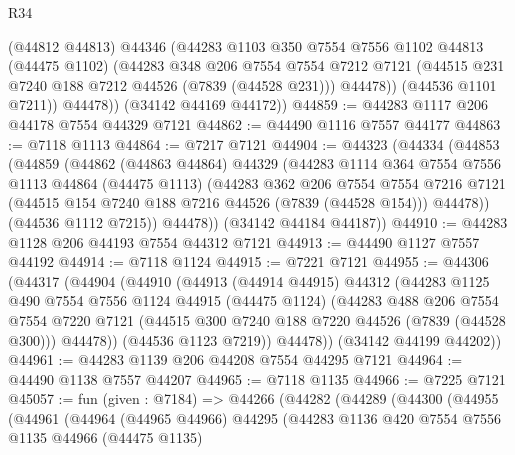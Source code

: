 \begin{lexlean}{R34}
\begin{coremodule}
            (@44812 @44813)
            @44346
            (@44283
              @1103
              @350
              @7554
              @7556
              @1102
              @44813
              (@44475 @1102)
              (@44283
                @348
                @206
                @7554
                @7554
                @7212
                @7121
                (@44515 @231 @7240 @188 @7212 @44526 (@7839 (@44528 @231)))
                @44478))
            (@44536 @1101 @7211))
          @44478))
      (@34142 @44169 @44172))
@44859 := @44283 @1117 @206 @44178 @7554 @44329 @7121
@44862 := @44490 @1116 @7557 @44177
@44863 := @7118 @1113
@44864 := @7217 @7121
@44904 := @44323
    (@44334
      (@44853
        (@44859
          (@44862
            (@44863 @44864)
            @44329
            (@44283
              @1114
              @364
              @7554
              @7556
              @1113
              @44864
              (@44475 @1113)
              (@44283
                @362
                @206
                @7554
                @7554
                @7216
                @7121
                (@44515 @154 @7240 @188 @7216 @44526 (@7839 (@44528 @154)))
                @44478))
            (@44536 @1112 @7215))
          @44478))
      (@34142 @44184 @44187))
@44910 := @44283 @1128 @206 @44193 @7554 @44312 @7121
@44913 := @44490 @1127 @7557 @44192
@44914 := @7118 @1124
@44915 := @7221 @7121
@44955 := @44306
    (@44317
      (@44904
        (@44910
          (@44913
            (@44914 @44915)
            @44312
            (@44283
              @1125
              @490
              @7554
              @7556
              @1124
              @44915
              (@44475 @1124)
              (@44283
                @488
                @206
                @7554
                @7554
                @7220
                @7121
                (@44515 @300 @7240 @188 @7220 @44526 (@7839 (@44528 @300)))
                @44478))
            (@44536 @1123 @7219))
          @44478))
      (@34142 @44199 @44202))
@44961 := @44283 @1139 @206 @44208 @7554 @44295 @7121
@44964 := @44490 @1138 @7557 @44207
@44965 := @7118 @1135
@44966 := @7225 @7121
@45057 := fun (given : @7184) =>
  @44266
    (@44282
      (@44289
        (@44300
          (@44955
            (@44961
              (@44964
                (@44965 @44966)
                @44295
                (@44283
                  @1136
                  @420
                  @7554
                  @7556
                  @1135
                  @44966
                  (@44475 @1135)

\end{coremodule}
\end{lexlean}

